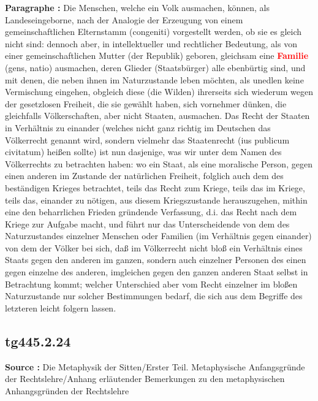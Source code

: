 \documentclass[a4paper,12pt,twoside]{book}
\newcommand{\match}[1]{\textcolor{red}{\textbf{#1}}}
\begin{document}
	\textbf{Paragraphe : }Die Menschen, welche ein Volk ausmachen, können, als Landeseingeborne, nach der Analogie der Erzeugung von einem gemeinschaftlichen Elternstamm (congeniti) vorgestellt werden, ob sie es gleich nicht sind: dennoch aber, in intellektueller und rechtlicher Bedeutung, als von einer gemeinschaftlichen Mutter (der Republik) geboren, gleichsam eine \match{Familie} (gens, natio) ausmachen, deren Glieder (Staatsbürger) alle ebenbürtig sind, und mit denen, die neben ihnen im Naturzustande leben möchten, als unedlen keine Vermischung eingehen, obgleich diese (die Wilden) ihrerseits sich wiederum wegen der gesetzlosen Freiheit, die sie gewählt haben, sich vornehmer dünken, die gleichfalls Völkerschaften, aber nicht Staaten, ausmachen. Das Recht der Staaten in Verhältnis zu einander (welches nicht ganz richtig im Deutschen das Völkerrecht genannt wird, sondern vielmehr das Staatenrecht (ius publicum civitatum) heißen sollte) ist nun dasjenige, was wir unter dem Namen des Völkerrechts zu betrachten haben: wo ein Staat, als eine moralische Person, gegen einen anderen im Zustande der natürlichen Freiheit, folglich auch dem des beständigen Krieges betrachtet, teils das Recht zum Kriege, teils das im Kriege, teils das, einander zu nötigen, aus diesem Kriegszustande herauszugehen, mithin eine den beharrlichen Frieden gründende Verfassung, d.i. das Recht nach dem Kriege zur Aufgabe macht, und führt nur das Unterscheidende von dem des Naturzustandes einzelner Menschen oder Familien (im Verhältnis gegen einander) von dem der Völker bei sich, daß im Völkerrecht nicht bloß ein Verhältnis eines Staats gegen den anderen im ganzen, sondern auch einzelner Personen des einen gegen einzelne des anderen, imgleichen gegen den ganzen anderen Staat selbst in Betrachtung kommt; welcher Unterschied aber vom Recht einzelner im  bloßen Naturzustande nur solcher Bestimmungen bedarf, die sich aus dem Begriffe des letzteren leicht folgern lassen. 
	
	\subsection*{tg445.2.24} 
	\textbf{Source : }Die Metaphysik der Sitten/Erster Teil. Metaphysische Anfangsgründe der Rechtslehre/Anhang erläutender Bemerkungen zu den metaphysischen Anhangsgründen der Rechtslehre\\  
	
\end{document}
